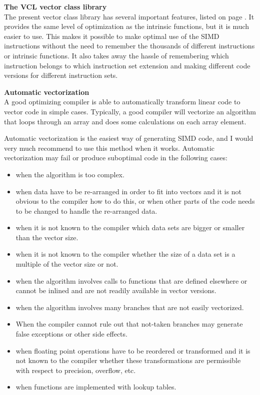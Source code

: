 \documentclass[vcl_manual.tex]{subfiles}
\begin{document}
\textbf{The VCL vector class library}\\
The present vector class library has several important features, listed on page \pageref{Features}. It provides the same level of optimization as the intrinsic functions, but it is much easier to use. This makes it possible to make optimal use of the SIMD instructions without the need to remember the thousands of different instructions or intrinsic functions. It also takes away the hassle of remembering which instruction belongs to which instruction set extension and making different code versions for different instruction sets.

\textbf{Automatic vectorization}\\
A good optimizing compiler is able to automatically transform linear code to vector code in simple cases. Typically, a good compiler will vectorize an algorithm that loops through an array and does some calculations on each array element.

Automatic vectorization is the easiest way of generating SIMD code, and I would very much recommend to use this method when it works. Automatic vectorization may fail or produce suboptimal code in the following cases:

\begin{itemize}
\item when the algorithm is too complex.
\item when data have to be re-arranged in order to fit into vectors and it is not obvious to the compiler how to do this, or when other parts of the code needs to be changed to handle the re-arranged data.
\item when it is not known to the compiler which data sets are bigger or smaller than the vector size.
\item when it is not known to the compiler whether the size of a data set is a multiple of the vector size or not.
\item when the algorithm involves calls to functions that are defined elsewhere or cannot be inlined and are not readily available in vector versions.
\item when the algorithm involves many branches that are not easily vectorized.
\item When the compiler cannot rule out that not-taken branches may generate false exceptions or other side effects.
\item when floating point operations have to be reordered or transformed and it is not known to the compiler whether these transformations are permissible with respect to precision, overflow, etc.
\item when functions are implemented with lookup tables.
\end{itemize}
\end{document}
